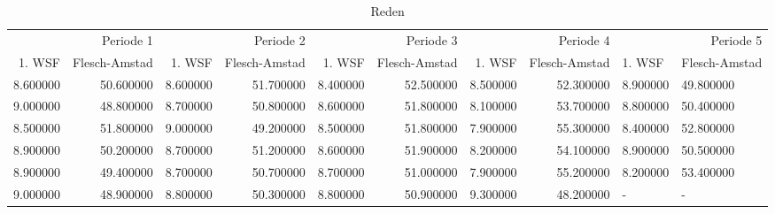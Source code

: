 \begin{table}
\caption{Reden}
\label{tab:meine_tabelle}
\begin{tabular}{rrrrrrrrll}
\toprule
\multicolumn{2}{r}{Periode 1} & \multicolumn{2}{r}{Periode 2} & \multicolumn{2}{r}{Periode 3} & \multicolumn{2}{r}{Periode 4} & \multicolumn{2}{r}{Periode 5} \\
1. WSF & Flesch-Amstad & 1. WSF & Flesch-Amstad & 1. WSF & Flesch-Amstad & 1. WSF & Flesch-Amstad & 1. WSF & Flesch-Amstad \\
\midrule
8.600000 & 50.600000 & 8.600000 & 51.700000 & 8.400000 & 52.500000 & 8.500000 & 52.300000 & 8.900000 & 49.800000 \\
9.000000 & 48.800000 & 8.700000 & 50.800000 & 8.600000 & 51.800000 & 8.100000 & 53.700000 & 8.800000 & 50.400000 \\
8.500000 & 51.800000 & 9.000000 & 49.200000 & 8.500000 & 51.800000 & 7.900000 & 55.300000 & 8.400000 & 52.800000 \\
8.900000 & 50.200000 & 8.700000 & 51.200000 & 8.600000 & 51.900000 & 8.200000 & 54.100000 & 8.900000 & 50.500000 \\
8.900000 & 49.400000 & 8.700000 & 50.700000 & 8.700000 & 51.000000 & 7.900000 & 55.200000 & 8.200000 & 53.400000 \\
9.000000 & 48.900000 & 8.800000 & 50.300000 & 8.800000 & 50.900000 & 9.300000 & 48.200000 & - & - \\
\bottomrule
\end{tabular}
\end{table}
